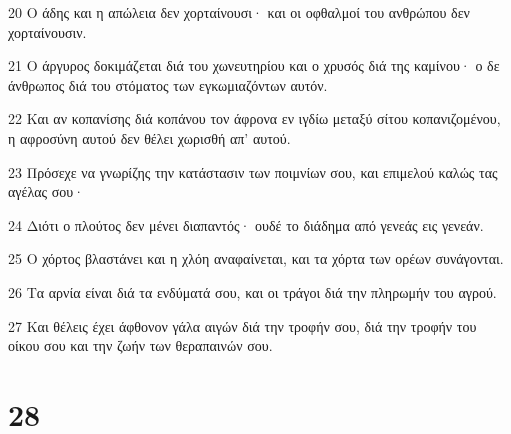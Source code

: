 \par 20 Ο άδης και η απώλεια δεν χορταίνουσι· και οι οφθαλμοί του ανθρώπου δεν χορταίνουσιν.
\par 21 Ο άργυρος δοκιμάζεται διά του χωνευτηρίου και ο χρυσός διά της καμίνου· ο δε άνθρωπος διά του στόματος των εγκωμιαζόντων αυτόν.
\par 22 Και αν κοπανίσης διά κοπάνου τον άφρονα εν ιγδίω μεταξύ σίτου κοπανιζομένου, η αφροσύνη αυτού δεν θέλει χωρισθή απ' αυτού.
\par 23 Πρόσεχε να γνωρίζης την κατάστασιν των ποιμνίων σου, και επιμελού καλώς τας αγέλας σου·
\par 24 Διότι ο πλούτος δεν μένει διαπαντός· ουδέ το διάδημα από γενεάς εις γενεάν.
\par 25 Ο χόρτος βλαστάνει και η χλόη αναφαίνεται, και τα χόρτα των ορέων συνάγονται.
\par 26 Τα αρνία είναι διά τα ενδύματά σου, και οι τράγοι διά την πληρωμήν του αγρού.
\par 27 Και θέλεις έχει άφθονον γάλα αιγών διά την τροφήν σου, διά την τροφήν του οίκου σου και την ζωήν των θεραπαινών σου.

\chapter{28}

